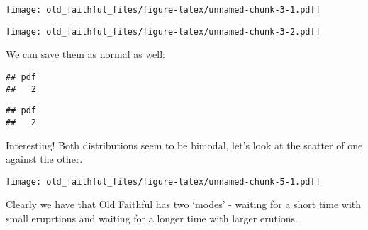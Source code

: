 \documentclass[]{article}
\newenvironment{Shaded}{\begin{snugshade}}{\end{snugshade}}
\newcommand{\DataTypeTok}[1]{\textcolor[rgb]{0.13,0.29,0.53}{#1}}
\newcommand{\KeywordTok}[1]{\textcolor[rgb]{0.13,0.29,0.53}{\textbf{#1}}}
\newcommand{\NormalTok}[1]{#1}
\newcommand{\OperatorTok}[1]{\textcolor[rgb]{0.81,0.36,0.00}{\textbf{#1}}}
\newcommand{\StringTok}[1]{\textcolor[rgb]{0.31,0.60,0.02}{#1}}
\begin{document}
\texttt{[image: old\_faithful\_files/figure-latex/unnamed-chunk-3-1.pdf]}

\begin{Shaded}
\end{Shaded}

\texttt{[image: old\_faithful\_files/figure-latex/unnamed-chunk-3-2.pdf]}

We can save them as normal as well:

\begin{Shaded}
\end{Shaded}

\begin{verbatim}
## pdf 
##   2
\end{verbatim}

\begin{Shaded}
\end{Shaded}

\begin{verbatim}
## pdf 
##   2
\end{verbatim}

Interesting! Both distributions seem to be bimodal, let's look at the
scatter of one against the other.

\begin{Shaded}
\end{Shaded}

\texttt{[image: old\_faithful\_files/figure-latex/unnamed-chunk-5-1.pdf]}

Clearly we have that Old Faithful has two `modes' - waiting for a short
time with small eruprtions and waiting for a longer time with larger
erutions.
\end{document}
